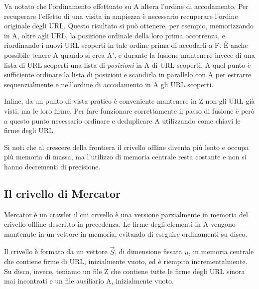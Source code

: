 Va notato che l'ordinamento effettuato su A altera l'ordine di accodamento. Per recuperare l'effetto di una visita in ampiezza è necessario recuperare l'ordine originale degli URL. Questo risultato si può ottenere, per esempio, memorizzando in A, oltre agli URL, la posizione ordinale della loro prima occorrenza, e riordinando i nuovi URL scoperti in tale ordine prima di accodarli a F. È anche possibile tenere A quando si crea A', e durante la fusione mantenere invece di una lista di URL scoperti una lista di \textit{posizioni} in A di URL scoperti. A quel punto è sufficiente ordinare la lista di posizioni e scandirla in parallelo con A per estrarre sequenzialmente e nell'ordine di accodamento in A gli URL scoperti.

Infine, da un punto di vista pratico è conveniente mantenere in Z non gli URL già visti, ma le loro firme. Per fare funzionare correttamente il passo di fusione è però a questo punto necessario ordinare e deduplicare A utilizzando come chiavi le firme degli URL.

Si noti che al crescere della frontiera il crivello offline diventa più lento e occupa più memoria di massa, ma l'utilizzo di memoria centrale resta costante e non si hanno decrementi di precisione.
\subsection{Il crivello di Mercator}
Mercator è un crawler \cite{Mercator} il cui crivello è una versione parzialmente in memoria del crivello offline descritto in precedenza. Le firme degli elementi in A vengono mantenute in un vettore in memoria, evitando di eseguire ordinamenti su disco.

Il crivello è formato da un vettore $\vec{S}$, di dimensione fissata $n$, in memoria centrale che contiene firme di URL, inizialmente vuoto, ed è riempito incrementalmente. Su disco, invece, teniamo un file Z che contiene tutte le firme degli URL sinora mai incontrati e un file ausiliario A, inizialmente vuoto.

